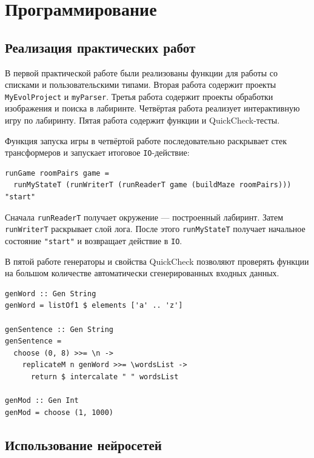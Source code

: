 \section{Программирование}

\subsection{Реализация практических работ}

В первой практической работе были реализованы функции для работы со списками и пользовательскими типами. Вторая работа содержит проекты \texttt{MyEvolProject} и \texttt{myParser}. Третья работа содержит проекты обработки изображения и поиска в лабиринте. Четвёртая работа реализует интерактивную игру по лабиринту. Пятая работа содержит функции и QuickCheck-тесты.

Функция запуска игры в четвёртой работе последовательно раскрывает стек трансформеров и запускает итоговое \texttt{IO}-действие:

\label{lst:run-game}
\begin{verbatim}
runGame roomPairs game =
  runMyStateT (runWriterT (runReaderT game (buildMaze roomPairs))) "start"
\end{verbatim}

Сначала \texttt{runReaderT} получает окружение --- построенный лабиринт. Затем \texttt{runWriterT} раскрывает слой лога. После этого \texttt{runMyStateT} получает начальное состояние \texttt{"start"} и возвращает действие в \texttt{IO}.

В пятой работе генераторы и свойства QuickCheck позволяют проверять функции на большом количестве автоматически сгенерированных входных данных.

\label{lst:quickcheck-generators}
\begin{verbatim}
genWord :: Gen String
genWord = listOf1 $ elements ['a' .. 'z']

genSentence :: Gen String
genSentence =
  choose (0, 8) >>= \n ->
    replicateM n genWord >>= \wordsList ->
      return $ intercalate " " wordsList

genMod :: Gen Int
genMod = choose (1, 1000)
\end{verbatim}

\subsection{Использование нейросетей}

